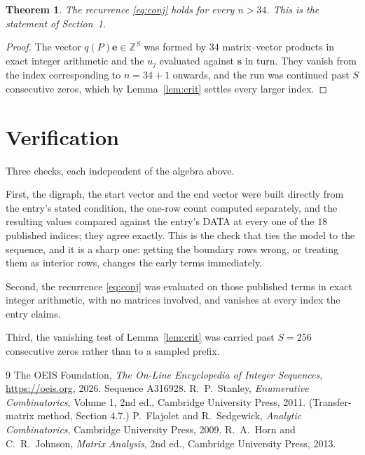 \documentclass[11pt,a4paper]{article}
\theoremstyle{plain}
\newtheorem{theorem}{Theorem}
\theoremstyle{definition}
\begin{document}
\begin{theorem}
The recurrence \eqref{eq:conj} holds for every $n>34$. This is the statement of
Section~1.
\end{theorem}

\begin{proof}
The vector $q(P)\mathbf{e}\in\mathbb{Z}^{S}$ was formed by $34$ matrix--vector
products in exact integer arithmetic and the $u_j$ evaluated against $\mathbf{s}$ in turn.
They vanish from the index corresponding to $n=34+1$ onwards, and the run was continued
past $S$ consecutive zeros, which by Lemma~\ref{lem:crit} settles every larger index.
\end{proof}

\section{Verification}

Three checks, each independent of the algebra above.

First, the digraph, the start vector and the end vector were built directly from the
entry's stated condition, the one-row count computed separately, and the resulting values
compared against the entry's DATA at every one of the $18$ published indices; they
agree exactly. This is the check that ties the model to the sequence, and it is a sharp one:
getting the boundary rows wrong, or treating them as interior rows, changes the early terms
immediately.

Second, the recurrence \eqref{eq:conj} was evaluated on those published terms in exact
integer arithmetic, with no matrices involved, and vanishes at every index the entry claims.

Third, the vanishing test of Lemma~\ref{lem:crit} was carried past $S=256$ consecutive
zeros rather than to a sampled prefix.

\begin{thebibliography}{9}
 The OEIS Foundation, \emph{The On-Line Encyclopedia of Integer
Sequences}, \url{https://oeis.org}, 2026. Sequence A316928.
 R.~P.~Stanley, \emph{Enumerative Combinatorics}, Volume 1, 2nd ed.,
Cambridge University Press, 2011. (Transfer-matrix method, Section 4.7.)
 P.~Flajolet and R.~Sedgewick, \emph{Analytic Combinatorics}, Cambridge
University Press, 2009.
 R.~A.~Horn and C.~R.~Johnson, \emph{Matrix Analysis}, 2nd ed., Cambridge
University Press, 2013.
\end{thebibliography}
\end{document}
